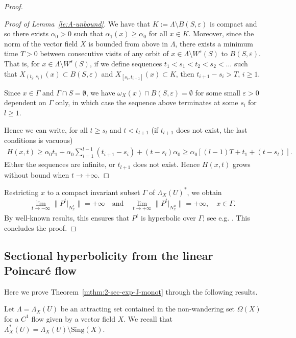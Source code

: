 \documentclass[12pt,reqno]{amsart}
\numberwithin{equation}{section}
\newcommand{\qand}{\quad\text{and}\quad}
\theoremstyle{plain}
\theoremstyle{definition}
\renewcommand{\epsilon}{\varepsilon}
\newcommand{\sing}{\mathrm{Sing}}
\begin{document}
\begin{proof}
\begin{proof}[Proof of Lemma~\ref{le:A-unbound}]
  We have that $K:=\Lambda\setminus B(S,\epsilon)$ is
  compact and so there exists $\alpha_0>0$ such that
  $\alpha_1(x)\ge\alpha_0$ for all $x\in K$. Moreover, since
  the norm of the vector field $X$ is bounded from above in
  $\Lambda$, there exists a minimum time $T>0$ between
  consecutive visits of any orbit of $x\in\Lambda\setminus
  W^s(S)$ to $B(S,\epsilon)$. That is, for
  $x\in\Lambda\setminus W^s(S)$, if we define sequences
  $t_1<s_1<t_2<s_2< \dots$ such that
  $X_{(t_i,s_i)}(x)\subset B(S,\epsilon)$ and
  $X_{[s_i,t_{i+1}]}(x)\subset K$, then $t_{i+1}-s_i>T$,
  $i\ge1$.

  Since $x\in\Gamma$ and $\Gamma\cap S=\emptyset$, we have
  $\omega_X(x)\cap B(S,\epsilon)=\emptyset$ for some small
  $\epsilon>0$ dependent on $\Gamma$ only, in which case the
  sequence above terminates at some $s_l$ for $l\ge1$.

  Hence we can write, for all $t\ge s_{l}$ and $t<t_{l+1}$
  (if $t_{l+1}$ does not exist, the last conditions is
  vacuous)
  \begin{align*}
    H(x,t)\ge \alpha_0 t_1+ \alpha_0\sum_{i=1}^{l-1}
    (t_{i+1}-s_i) + (t-s_l)\alpha_0 \ge \alpha_0 [(l-1) T +
    t_1 + (t-s_l)].
  \end{align*}
  Either the sequences are infinite, or $t_{l+1}$ does not
  exist. Hence $H(x,t)$ grows without bound when
  $t\to+\infty$.
\end{proof}

Restricting $x$ to a compact invariant subset $\Gamma$ of
$\Lambda_X(U)^*$, we obtain
\begin{align*}
  \lim\limits_{t\to-\infty}\|P^t\vert_{N^s_x}\|=+\infty
  \qand
  \lim\limits_{t\to+\infty}\|P^t\vert_{N^u_x}\|=+\infty,
  \quad x\in\Gamma.
\end{align*}
By well-known results, this ensures that $P^t$ is
hyperbolic over $\Gamma$; see e.g. \cite{Man82}. This
concludes the proof.
\end{proof}

\subsection{Sectional hyperbolicity from the linear Poincar\'e flow}
\label{sec:section-hyperb-from}

Here we prove Theorem~\ref{mthm:2-sec-exp-J-monot} through the
following results.

Let $\Lambda=\Lambda_X(U)$ be an attracting set contained in
the non-wandering set $\Omega(X)$ for a $C^1$ flow given by
a vector field $X$. We recall that
$\Lambda^*_X(U)=\Lambda_X(U)\setminus \sing(X)$.
\end{document}
